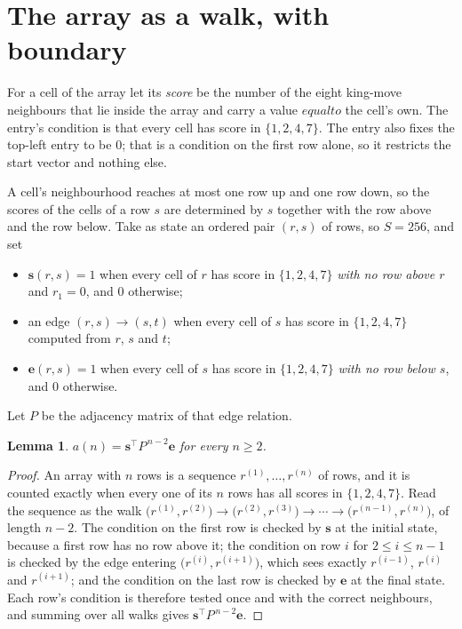 \documentclass[11pt,a4paper]{article}
\theoremstyle{plain}
\newtheorem{lemma}[theorem]{Lemma}
\theoremstyle{definition}
\begin{document}
\section{The array as a walk, with boundary}

For a cell of the array let its \emph{score} be the number of the eight king-move neighbours that lie inside
the array and carry a value $equal to$ the cell's own. The entry's condition is that every cell
has score in $\{1,2,4,7\}$. The entry also fixes the top-left entry to be $0$; that is a condition on the first row alone, so it restricts the start vector and nothing else.

A cell's neighbourhood reaches at most one row up and one row down, so the scores of the
cells of a row $s$ are determined by $s$ together with the row above and the row below.
Take as state an ordered pair $(r,s)$ of rows, so $S=256$, and set
\begin{itemize}
\item $\mathbf{s}(r,s)=1$ when every cell of $r$ has score in $\{1,2,4,7\}$ \emph{with no row
above $r$} and $r_1=0$, and $0$ otherwise;
\item an edge $(r,s)\to(s,t)$ when every cell of $s$ has score in $\{1,2,4,7\}$ computed from
$r$, $s$ and $t$;
\item $\mathbf{e}(r,s)=1$ when every cell of $s$ has score in $\{1,2,4,7\}$ \emph{with no row
below $s$}, and $0$ otherwise.
\end{itemize}
Let $P$ be the adjacency matrix of that edge relation.

\begin{lemma}\label{lem:walk}
$a(n)=\mathbf{s}^{\!\top}P^{\,n-2}\mathbf{e}$ for every $n\ge2$.
\end{lemma}

\begin{proof}
An array with $n$ rows is a sequence $r^{(1)},\dots,r^{(n)}$ of rows, and it is counted
exactly when every one of its $n$ rows has all scores in $\{1,2,4,7\}$. Read the sequence as the
walk $\bigl(r^{(1)},r^{(2)}\bigr)\to\bigl(r^{(2)},r^{(3)}\bigr)\to\cdots\to
\bigl(r^{(n-1)},r^{(n)}\bigr)$, of length $n-2$. The condition on the first row is
checked by $\mathbf{s}$ at the initial state, because a first row has no row above it; the
condition on row $i$ for $2\le i\le n-1$ is checked by the edge entering
$\bigl(r^{(i)},r^{(i+1)}\bigr)$, which sees exactly $r^{(i-1)}$, $r^{(i)}$ and
$r^{(i+1)}$; and the condition on the last row is checked by $\mathbf{e}$ at the final
state. Each row's condition is therefore tested once and with the correct neighbours, and
summing over all walks gives $\mathbf{s}^{\!\top}P^{\,n-2}\mathbf{e}$.
\end{proof}
\end{document}
